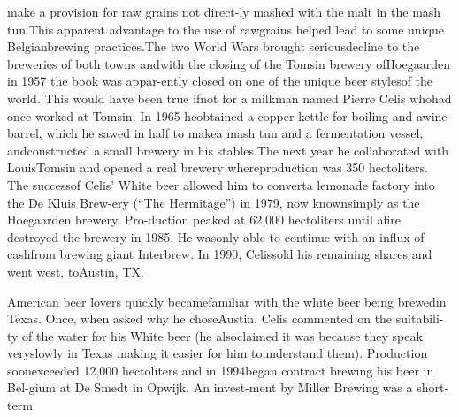\documentclass[a4paper,parskip=half]{scrartcl}
\begin{document}
make a provision for raw grains not direct-ly mashed with the malt in the mash tun.This apparent advantage to the use of rawgrains helped lead to some unique Belgianbrewing practices.The two World Wars brought seriousdecline to the breweries of both towns andwith the closing of the Tomsin brewery ofHoegaarden in 1957 the book was appar-ently closed on one of the unique beer stylesof the world. This would have been true ifnot for a milkman named Pierre Celis whohad once worked at Tomsin. In 1965 heobtained a copper kettle for boiling and awine barrel, which he sawed in half to makea mash tun and a fermentation vessel, andconstructed a small brewery in his stables.The next year he collaborated with LouisTomsin and opened a real brewery whereproduction was 350 hectoliters. The successof Celis’ White beer allowed him to converta lemonade factory into the De Kluis Brew-ery (“The Hermitage”) in 1979, now knownsimply as the Hoegaarden brewery. Pro-duction peaked at 62,000 hectoliters until afire destroyed the brewery in 1985. He wasonly able to continue with an influx of cashfrom brewing giant Interbrew. In 1990, Celissold his remaining shares and went west, toAustin, TX.

\parencite[28]{Sparrow2002} 

American beer lovers quickly becamefamiliar with the white beer being brewedin Texas. Once, when asked why he choseAustin, Celis commented on the suitabili-ty of the water for his White beer (he alsoclaimed it was because they speak veryslowly in Texas making it easier for him tounderstand them). Production soonexceeded 12,000 hectoliters and in 1994began contract brewing his beer in Bel-gium at De Smedt in Opwijk. An invest-ment by Miller Brewing was a short-term
\end{document}
